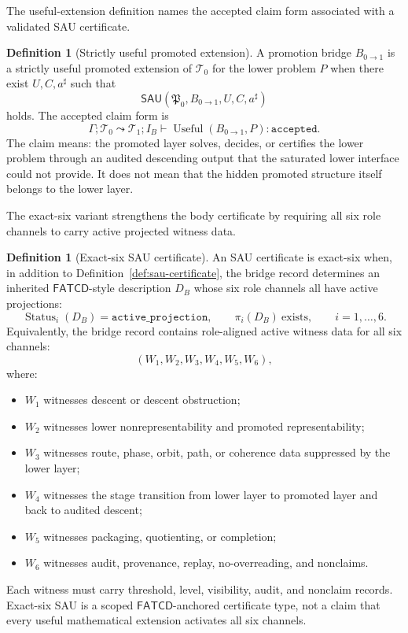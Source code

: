 \documentclass[11pt]{article}
\theoremstyle{definition}
\newtheorem{definition}[theorem]{Definition}
\begin{document}
The useful-extension definition names the accepted claim form associated with a
validated SAU certificate.

\begin{definition}[Strictly useful promoted extension]
\label{def:sau-useful-extension}
A promotion bridge \(B_{0\to1}\) is a strictly useful promoted extension of \(\mathcal T_0\) for the lower problem \(P\) when there exist \(U,C,a^\sharp\) such that
\[
\mathsf{SAU}(\mathfrak P_0,B_{0\to1},U,C,a^\sharp)
\]
holds. The accepted claim form is
\[
\Gamma;\mathcal T_0\leadsto\mathcal T_1;I_B
\vdash
\operatorname{Useful}(B_{0\to1},P):\texttt{accepted}.
\]
The claim means: the promoted layer solves, decides, or certifies the lower problem through an audited descending output that the saturated lower interface could not provide. It does not mean that the hidden promoted structure itself belongs to the lower layer.
\end{definition}

The exact-six variant strengthens the body certificate by requiring all six
role channels to carry active projected witness data.

\begin{definition}[Exact-six SAU certificate]
\label{def:sau-exact-six}
An SAU certificate is exact-six when, in addition to Definition~\ref{def:sau-certificate}, the bridge record determines an inherited \(\mathsf{FATCD}\)-style description \(D_B\) whose six role channels all have active projections:
\[
\operatorname{Status}_i(D_B)=\texttt{active\_projection},
\qquad
\pi_i(D_B)\ \text{exists},
\qquad
i=1,\ldots,6.
\]
Equivalently, the bridge record contains role-aligned active witness data for all six channels:
\[
(W_1,W_2,W_3,W_4,W_5,W_6),
\]
where:
\begin{itemize}
\item \(W_1\) witnesses descent or descent obstruction;
\item \(W_2\) witnesses lower nonrepresentability and promoted representability;
\item \(W_3\) witnesses route, phase, orbit, path, or coherence data suppressed by the lower layer;
\item \(W_4\) witnesses the stage transition from lower layer to promoted layer and back to audited descent;
\item \(W_5\) witnesses packaging, quotienting, or completion;
\item \(W_6\) witnesses audit, provenance, replay, no-overreading, and nonclaims.
\end{itemize}
Each witness must carry threshold, level, visibility, audit, and nonclaim records. Exact-six SAU is a scoped \(\mathsf{FATCD}\)-anchored certificate type, not a claim that every useful mathematical extension activates all six channels.
\end{definition}
\end{document}
